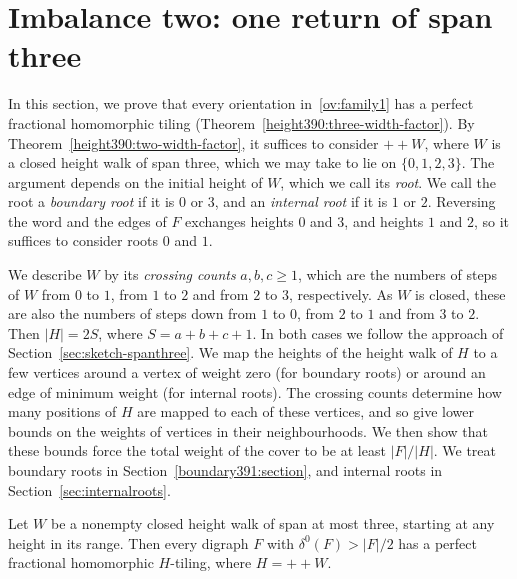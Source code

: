 \section{Imbalance two: one return of span three}\label{height390:three-section}
In this section, we prove that every orientation in~\ref{ov:family1} has a perfect fractional homomorphic tiling (Theorem~\ref{height390:three-width-factor}). By Theorem~\ref{height390:two-width-factor}, it suffices to consider $++W$, where $W$ is a closed height walk of span three, which we may take to lie on $\{0,1,2,3\}$. The argument depends on the initial height of $W$, which we call its \emph{root}. We call the root a \emph{boundary root} if it is $0$ or $3$, and an \emph{internal root} if it is $1$ or $2$. Reversing the word and the edges of $F$ exchanges heights $0$ and $3$, and heights $1$ and $2$, so it suffices to consider roots $0$ and $1$.

We describe $W$ by its \emph{crossing counts} $a,b,c\ge1$, which are the numbers of steps of $W$ from $0$ to $1$, from $1$ to $2$ and from $2$ to $3$, respectively. As $W$ is closed, these are also the numbers of steps down from $1$ to $0$, from $2$ to $1$ and from $3$ to $2$. Then $|H|=2S$, where $S=a+b+c+1$.
In both cases we follow the approach of Section~\ref{sec:sketch-spanthree}. We map the heights of the height walk of $H$ to a few vertices around a vertex of weight zero (for boundary roots) or around an edge of minimum weight (for internal roots). The crossing counts determine how many positions of $H$ are mapped to each of these vertices, and so give lower bounds on the weights of vertices in their neighbourhoods. We then show that these bounds force the total weight of the cover to be at least $|F|/|H|$.
We treat boundary roots in Section~\ref{boundary391:section}, and internal roots in Section~\ref{sec:internalroots}.

\begin{theorem}
\label{height390:three-width-factor}
Let $W$ be a nonempty closed height walk of span at most three, starting at any height in its range. Then every digraph
$F$ with $\delta^0(F)>|F|/2$ has a perfect fractional homomorphic
$H$-tiling, where $H=++W$.
\end{theorem}


